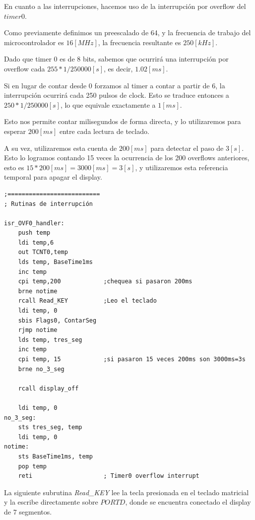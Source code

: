 \documentclass[a4paper, 12pt]{article}
\begin{document}
En cuanto a las interrupciones, hacemos uso de la interrupción por overflow del $timer0$.

Como previamente definimos un preescalado de 64, y la frecuencia de trabajo del microcontrolador es $16[MHz]$, la frecuencia resultante es $250[kHz]$.

Dado que timer 0 es de 8 bits, sabemos que ocurrirá una interrupción por overflow cada $255*1/250000[s]$, es decir, $1.02[ms]$.

Si en lugar de contar desde 0 forzamos al timer a contar a partir de 6, la interrupción ocurrirá cada 250 pulsos de clock. Esto se traduce entonces a $250*1/250000[s]$, lo que equivale exactamente a $1[ms]$.

Esto nos permite contar milisegundos de forma directa, y lo utilizaremos para esperar $200[ms]$ entre cada lectura de teclado.

A su vez, utilizaremos esta cuenta de $200[ms]$ para detectar el paso de $3[s]$. Esto lo logramos contando 15 veces la ocurrencia de los 200 overflows anteriores, esto es $15*200[ms]=3000[ms]=3[s]$, y utilizaremos esta referencia temporal para apagar el display.

\begin{lstlisting}
;==========================
; Rutinas de interrupción

isr_OVF0_handler:
	push temp
	ldi	temp,6
	out TCNT0,temp
	lds temp, BaseTime1ms
	inc temp
	cpi temp,200			;chequea si pasaron 200ms
	brne notime
	rcall Read_KEY			;Leo el teclado
	ldi temp, 0
	sbis Flags0, ContarSeg
	rjmp notime
	lds temp, tres_seg
	inc temp
	cpi temp, 15			;si pasaron 15 veces 200ms son 3000ms=3s
	brne no_3_seg
	
	rcall display_off

	ldi temp, 0
no_3_seg:
	sts tres_seg, temp
	ldi temp, 0
notime:
	sts BaseTime1ms, temp
	pop temp
	reti					; Timer0 overflow interrupt  
\end{lstlisting}

La siguiente subrutina \textit{Read\_KEY} lee la tecla presionada en el teclado matricial y la escribe directamente sobre $PORTD$, donde se encuentra conectado el display de 7 segmentos.
\end{document}

